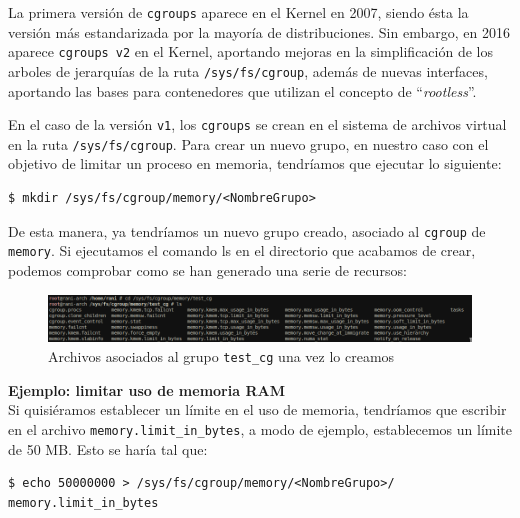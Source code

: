 \documentclass[a4paper, oneside, 12pt]{book}
\begin{document}
	\noindent La primera versión de \texttt{cgroups} aparece en el Kernel en 2007, siendo ésta la versión más estandarizada por la mayoría de distribuciones. Sin embargo, en 2016 aparece \texttt{cgroups v2} en el Kernel, aportando mejoras en la simplificación de los arboles de jerarquías de la ruta \texttt{/sys/fs/cgroup}, además de nuevas interfaces, aportando las bases para contenedores que utilizan el concepto de ``\textit{rootless}''. \\
	
	\par \noindent En el caso de la versión \texttt{v1}, los \texttt{cgroups} se crean en el sistema de archivos virtual en la ruta \texttt{/sys/fs/cgroup}. Para crear un nuevo grupo, en nuestro caso con el objetivo de limitar un proceso en memoria, tendríamos que ejecutar lo siguiente:
	\begin{verbatim}
$ mkdir /sys/fs/cgroup/memory/<NombreGrupo>
	\end{verbatim}

	\noindent De esta manera, ya tendríamos un nuevo grupo creado, asociado al \texttt{cgroup} de \texttt{memory}. Si ejecutamos el comando ls en el directorio que acabamos de crear, podemos comprobar como se han generado una serie de recursos: 
	
	\begin{figure}[h!]
		\begin{center}
			\includegraphics[width=1\textwidth]{img/cgroup_memory_ls.png}
			\caption{Archivos asociados al grupo \texttt{test\_cg} una vez lo creamos}
		\end{center}
	\end{figure}

	\pagebreak
	
	\noindent \textbf{\large Ejemplo: limitar uso de memoria RAM}\\
	
	\noindent Si quisiéramos establecer un límite en el uso de memoria, tendríamos que escribir en el archivo \texttt{memory.limit\_in\_bytes}, a modo de ejemplo, establecemos un límite de 50 MB. Esto se haría tal que:
	\begin{verbatim}
$ echo 50000000 > /sys/fs/cgroup/memory/<NombreGrupo>/
memory.limit_in_bytes
	\end{verbatim}
\end{document}
